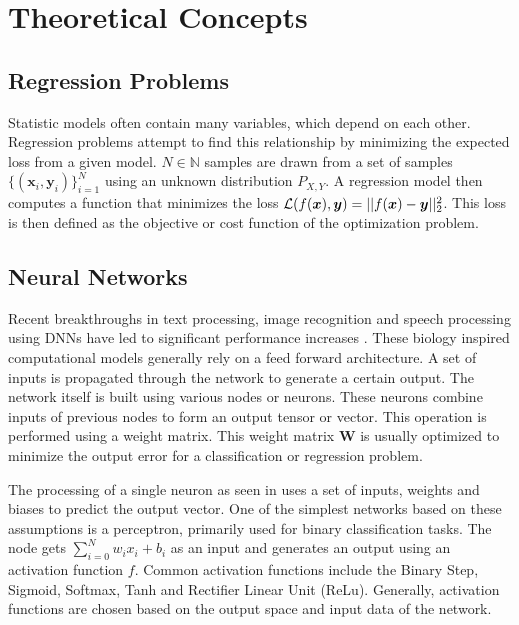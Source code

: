 \chapter{Theoretical Concepts}\label{sec:chapter}


\section{Regression Problems}\label{sec:section}

\begingroup
Statistic models often contain many variables, which depend on each other.
Regression problems attempt to find this relationship by minimizing the expected
loss from a given model. $ N \in  \mathbb{N} $ samples are drawn from a set of samples
$ \{(\bm{x}_i, \bm{y}_i)\}^N_{i=1} $ using an unknown distribution $ P_{X,Y} $. A regression model
then computes a function that minimizes the loss
$ \mathcal{L}(f(\bm{x}), \bm{y}) = \lvert\lvert f(\bm{x}) - \bm{y} \rvert\rvert^2_2 $. This loss is then
defined as the objective or cost function of the optimization problem.
\endgroup


\section{Neural Networks}\label{sec:section}


\begingroup
Recent breakthroughs in text processing, image recognition and speech processing using DNNs
have led to significant performance increases \cite{GoogleTranslation, AlexNet, SpeechRecognition}. These biology inspired computational models generally rely on a feed forward architecture.
A set of inputs is propagated through the network to generate a certain output. The network itself is built using various nodes
or neurons. These neurons combine inputs of previous nodes to form an output tensor or vector. This operation is performed using a weight matrix.
This weight matrix $\bm{W}$ is usually optimized to minimize the output error for a classification or regression problem.

The processing of a single neuron as seen in \cite{Neural} uses a set of inputs, weights and biases to predict the output vector.
One of the simplest networks based on these assumptions is a perceptron, primarily used for binary classification tasks. The node
gets $\sum_{i=0}^{N}{w_i x_i + b_i}$ as an input and generates an output using an activation function $f$. Common
activation functions include the Binary Step, Sigmoid, Softmax, Tanh and Rectifier Linear Unit (ReLu). Generally, activation functions are chosen
based on the output space and input data of the network.

